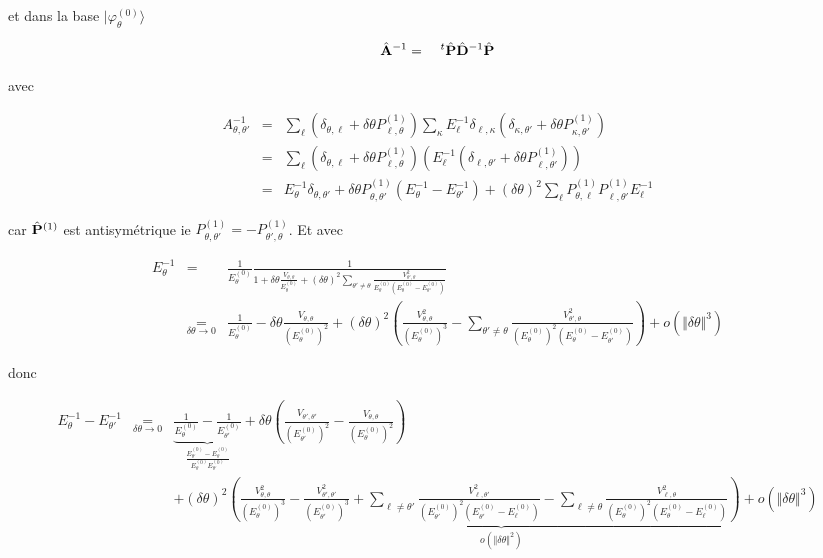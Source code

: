 et dans la base $\vert \varphi_\theta^{(0)} \rangle $

\begin{eqnarray*}
	\hat{\mathbf{A}}^{-1} & = & {~}^t\hat{\mathbf{P}}\hat{\mathbf{D}}^{-1} \hat{\mathbf{P}}	
\end{eqnarray*}

avec 

\begin{eqnarray*}
	A^{-1}_{\theta,\theta'} & = & \sum_\ell (\delta_{\theta,\ell} +  \delta \theta P^{(1)}_{\ell , \theta} ) \sum_\kappa 	E_\ell^{-1} \delta_{\ell,\kappa} (\delta_{\kappa,\theta'} +  \delta \theta P^{(1)}_{\kappa , \theta'} )\\
	& = &   \sum_\ell (\delta_{\theta,\ell} +  \delta \theta P^{(1)}_{\ell , \theta} ) ( E_\ell^{-1} (\delta_{\ell,\theta'} + \delta \theta P^{(1)}_{\ell , \theta'})) \\
	& = & E_\theta^{-1} \delta_{\theta, \theta'} + \delta \theta P_{\theta,\theta'}^{(1)} ( E_\theta^{-1} - E_{\theta'}^{-1}  ) + (\delta \theta)^2 \sum_\ell P_{\theta,\ell}^{(1)}P_{\ell,\theta'}^{(1)}  E_{\ell}^{-1}  
\end{eqnarray*}

car $\hat{\mathbf{P}}^{(1)}$ est antisymétrique ie $P_{\theta,\theta'}^{(1)} = -P_{\theta',\theta}^{(1)}$. Et avec 

\begin{eqnarray*}
	E_\theta^{-1} & = & \frac{1}{E_\theta^{(0)}} \frac{1}{ 1 + \delta \theta \frac{V_{\theta,\theta}}{ E_\theta^{(0)}}  + (\delta  \theta)^2 \sum_{\theta' \neq \theta} \frac{ V_{\theta',\theta}^2}{E_\theta^{(0)} ( E_\theta^{(0)} - E_{\theta'}^{(0)})	}	}\\
	& \underset{\delta \theta \to 0 }{=} & \frac{1}{E_\theta^{(0)}} - \delta \theta \frac{V_{\theta,\theta}}{ (E_\theta^{(0)})^2} + ( \delta \theta )^2  \left ( \frac{V_{\theta,\theta}^2}{ (E_\theta^{(0)})^3} - \sum_{\theta' \neq \theta} \frac{ V_{\theta',\theta}^2}{(E_\theta^{(0)})^2 ( E_\theta^{(0)} - E_{\theta'}^{(0)})	}\right) + o ( \Vert \delta \theta\Vert^3 ) 
\end{eqnarray*}

donc 

\begin{eqnarray*}
	E_\theta^{-1} - E_{\theta'}^{-1}	 & \underset{\delta \theta \to 0 }{=} &	 \underbrace{\frac{1}{E_\theta^{(0)}} - \frac{1}{E_{\theta'}^{(0)}}}_{\frac{E_{\theta'}^{(0)}-E_{\theta}^{(0)}}{E_{\theta}^{(0)}E_{\theta'}^{(0)}}} + \delta \theta \left ( \frac{V_{\theta',\theta'}}{ (E_{\theta'}^{(0)})^2} - \frac{V_{\theta,\theta}}{ (E_\theta^{(0)})^2}\right ) \\
	& & + \underbrace{(\delta \theta )^2 \left ( \frac{V_{\theta,\theta}^2}{ (E_\theta^{(0)})^3} - \frac{V_{\theta',\theta'}^2}{ (E_{\theta'}^{(0)})^3} + \sum_{\ell \neq \theta'} \frac{ V_{\ell,\theta'}^2}{(E_{\theta'}^{(0)})^2 ( E_{\theta'}^{(0)} - E_{\ell}^{(0)})	} - \sum_{\ell \neq \theta} \frac{ V_{\ell,\theta}^2}{(E_\theta^{(0)})^2 ( E_\theta^{(0)} - E_{\ell}^{(0)})	}\right ) + o ( \Vert \delta \theta \Vert^3 ) }_{ o ( \Vert \delta \theta \Vert^2 )}
\end{eqnarray*}

